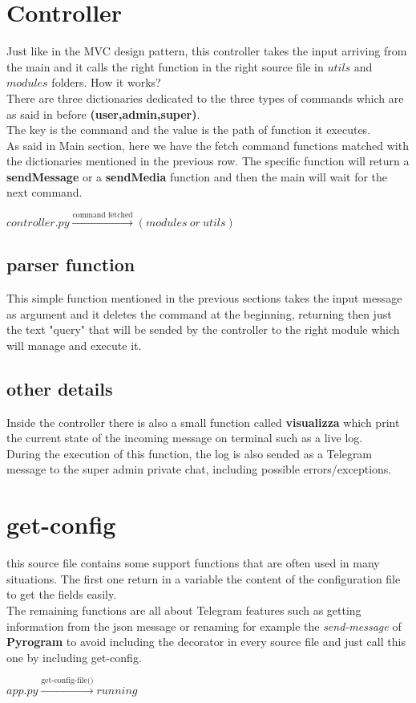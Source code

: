 \documentclass{article}
\begin{document}
\section{Controller}
Just like in the MVC design pattern, this controller takes the input arriving from the main and it calls the right function in the right source file in $utils$ and $modules$ folders. How it works? \\
There are three dictionaries dedicated to the three types of commands which are as said in before \textbf{(user,admin,super)}. \\The key is the command and the value is the path of function it executes. \\As said in Main section, here we have the fetch command functions matched with the dictionaries mentioned in the previous row. The specific function will return a \textbf{sendMessage} or a \textbf{sendMedia} function and then the main will wait for the next command.
\begin{center} $controller.py \xrightarrow{\text{command fetched}} (modules \ or \ utils)$ \end{center}

\subsection{parser function}
This simple function mentioned in the previous sections takes the input message as argument and it deletes the command at the beginning, returning then just the text "query" that will be sended by the controller to the right module which will manage and execute it.

\subsection{other details}
Inside the controller there is also a small function called \textbf{visualizza} which print the current state of the incoming message on terminal such as a live log.\\ During the execution of this function, the log is also sended as a Telegram message to the super admin private chat, including possible errors/exceptions.  \\

\section{get-config}
this source file contains some support functions that are often used in many situations. The first one return in a variable the content of the configuration file to get the fields easily. \\
The remaining functions are all about Telegram features such as getting information from the json message or renaming for example the \textit{send-message} of \textbf{Pyrogram} to avoid including the decorator in every source file and just call this one by including get-config.
\begin{center} $app.py \xrightarrow{\text{get-config-file()}} running$ \end{center}
\end{document}

